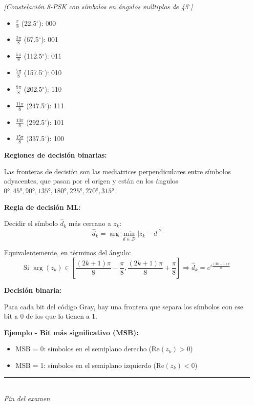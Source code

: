 \documentclass[11pt,a4paper]{article}
\begin{document}
\begin{center}
\textit{[Constelaci\'on 8-PSK con s\'imbolos en \'angulos m\'ultiplos de 45$^\circ$]}
\begin{itemize}
    \item $\frac{\pi}{8}$ (22.5$^\circ$): 000
    \item $\frac{3\pi}{8}$ (67.5$^\circ$): 001
    \item $\frac{5\pi}{8}$ (112.5$^\circ$): 011
    \item $\frac{7\pi}{8}$ (157.5$^\circ$): 010
    \item $\frac{9\pi}{8}$ (202.5$^\circ$): 110
    \item $\frac{11\pi}{8}$ (247.5$^\circ$): 111
    \item $\frac{13\pi}{8}$ (292.5$^\circ$): 101
    \item $\frac{15\pi}{8}$ (337.5$^\circ$): 100
\end{itemize}
\end{center}

\textbf{Regiones de decisi\'on binarias:}

Las fronteras de decisi\'on son las mediatrices perpendiculares entre s\'imbolos adyacentes, que pasan por el origen y est\'an en los \'angulos $0°, 45°, 90°, 135°, 180°, 225°, 270°, 315°$.

\textbf{Regla de decisi\'on ML:}

Decidir el s\'imbolo $\hat{d}_k$ m\'as cercano a $z_k$:
\[
\hat{d}_k = \arg\min_{d \in \mathcal{D}} |z_k - d|^2
\]

Equivalentemente, en t\'erminos del \'angulo:
\[
\text{Si } \arg(z_k) \in \left[\frac{(2k+1)\pi}{8} - \frac{\pi}{8}, \frac{(2k+1)\pi}{8} + \frac{\pi}{8}\right] \Rightarrow \hat{d}_k = e^{i\frac{(2k+1)\pi}{8}}
\]

\textbf{Decisi\'on binaria:}

Para cada bit del c\'odigo Gray, hay una frontera que separa los s\'imbolos con ese bit a 0 de los que lo tienen a 1.

\textbf{Ejemplo - Bit m\'as significativo (MSB):}
\begin{itemize}
    \item MSB = 0: s\'imbolos en el semiplano derecho (Re$(z_k) > 0$)
    \item MSB = 1: s\'imbolos en el semiplano izquierdo (Re$(z_k) < 0$)
\end{itemize}



\vspace{1cm}
\begin{center}
\rule{0.8\linewidth}{0.4pt}\\
\textit{Fin del examen}
\end{center}
\end{document}
